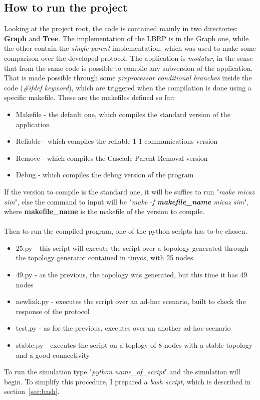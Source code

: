 \documentclass{article}
\begin{document}
\subsection{How to run the project}
\label{sec:howto}
Looking at the project root, the code is contained mainly in two directories: \textbf{Graph} and \textbf{Tree}. The implementation of the LBRP is in the Graph one, while the other contain the \textit{single-parent} implementation, which was used to make some comparison over the developed protocol. The application is \textit{modular}, in the sense that from the same code is possible to compile any subversion of the application. That is made possible through some \emph{preprocessor conditional branches} inside the code (\textit{\#ifdef keyword}), which are triggered when the compilation is done using a specific makefile. These are the makefiles defined so far:
\begin{itemize}
  \item Makefile - the default one, which compiles the standard version of the application
  \item Reliable - which compiles the reliable 1-1 communications version
  \item Remove - which compiles the Cascade Parent Removal version
  \item Debug - which compiles the debug version of the program
\end{itemize}

If the version to compile is the standard one, it will be suffies to run "\textit{make micaz sim}", else the command to input will be "\textit{make -f \textbf{makefile\_name} micaz sim}", where \textbf{makefile\_name} is the makefile of the version to compile.\\
\\Then to run the compiled program, one of the python scripts has to be chosen. 
\begin{itemize}
  \item 25.py - this script will execute the script over a topology generated through the topology generator contained in tinyos, with 25 nodes
  \item 49.py - as the previous, the topology was generated, but this time it has 49 nodes
  \item newlink.py - executes the script over an ad-hoc scenario, built to check the response of the protocol
  \item test.py - as for the previous, executes over an another ad-hoc scenario
  \item stable.py - executes the script on a toplogy of 8 nodes with a stable topology and a good connectivity
\end{itemize}
To run the simulation type "\textit{python name\_of\_script}" and the simulation will begin.
To simplify this procedure, I prepared a \emph{bash script}, which is described in section~\ref{sec:bash}.
\end{document}
